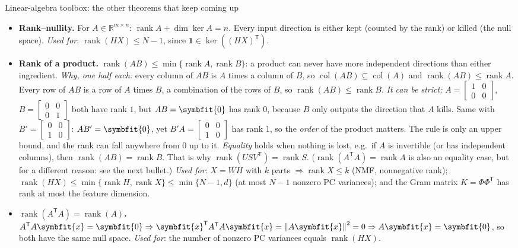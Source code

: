 \documentclass[11pt]{article}
\newcommand{\bm}[1]{\symbfit{#1}}
\newcounter{keyfact}
\newcommand{\R}{\mathbb{R}}
\newcommand{\one}{\symbf{1}}
\newcommand{\T}{^{\mathsf T}}
\newcommand{\rank}{\operatorname{rank}}
\newcommand{\col}{\operatorname{col}}
\newcommand{\norm}[1]{\left\lVert #1\right\rVert}
\begin{document}
\begin{keyfactbox}{Linear-algebra toolbox: the other theorems that keep coming up}\label{kf:toolbox}
\begin{itemize}[leftmargin=1.3em]
\item \textbf{Rank--nullity.} For $A\in\R^{m\times n}$: $\rank A+\dim\ker A=n$. Every input direction is either kept
(counted by the rank) or killed (the null space). \emph{Used for}: $\rank(HX)\le N-1$, since $\one\in\ker((HX)\T)$.
\item \textbf{Rank of a product.} $\boxed{\rank(AB)\le\min\{\rank A,\rank B\}}$: a product can never have more independent
directions than either ingredient.
\emph{Why, one half each:} every column of $AB$ is $A$ times a column of $B$, so $\col(AB)\subseteq\col(A)$ and
$\rank(AB)\le\rank A$. Every row of $AB$ is a row of $A$ times $B$, a combination of the rows of $B$, so
$\rank(AB)\le\rank B$.
\emph{It can be strict:} $A=\begin{bmatrix}1&0\\0&0\end{bmatrix}$, $B=\begin{bmatrix}0&0\\0&1\end{bmatrix}$ both have rank $1$, but $AB=\bm0$ has rank $0$, because $B$ only
outputs the direction that $A$ kills. Same with $B'=\begin{bmatrix}0&0\\1&0\end{bmatrix}$: $AB'=\bm0$, yet $B'A=\begin{bmatrix}0&0\\1&0\end{bmatrix}$ has rank $1$, so the
\emph{order} of the product matters. The rule is only an upper bound, and the rank can fall anywhere from $0$ up to it.
\emph{Equality} holds when nothing is lost, e.g.\ if $A$ is invertible (or has independent columns), then $\rank(AB)=\rank B$.
That is why $\rank(USV\T)=\rank S$. ($\rank(A\T A)=\rank A$ is also an equality case, but for a different reason: see the next bullet.)
\emph{Used for}: $X=WH$ with $k$ parts $\Rightarrow\rank X\le k$ (NMF, nonnegative rank); $\rank(HX)\le\min\{\rank H,\rank X\}\le\min\{N-1,d\}$
(at most $N-1$ nonzero PC variances); and the Gram matrix $K=\Phi\Phi\T$ has rank at most the feature dimension.
\item \textbf{$\rank(A\T A)=\rank(A)$.} $A\T A\bm x=\bm0\Rightarrow\bm x\T A\T A\bm x=\norm{A\bm x}^2=0\Rightarrow A\bm x=\bm0$, so both have the same
null space. \emph{Used for}: the number of nonzero PC variances equals $\rank(HX)$.

\end{itemize}
\end{keyfactbox}
\end{document}

